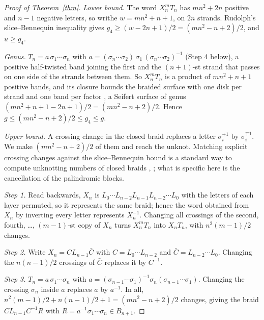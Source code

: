 \documentclass[11pt]{article}
\begin{document}
\begin{proof}[Proof of Theorem~\ref{thm}]
\emph{Lower bound.} The word $X_n^m T_n$ has $mn^2 + 2n$ positive and $n-1$ negative letters, so writhe
$w = mn^2+n+1$, on $2n$ strands. Rudolph's slice--Bennequin inequality \cite{Rud93} gives
$g_4 \ge (w - 2n + 1)/2 = (mn^2-n+2)/2$, and $u \ge g_4$.

\emph{Genus.} $T_n = a\,\sigma_1\cdots\sigma_n$ with $a = (\sigma_n\cdots\sigma_2)\,\sigma_1\,(\sigma_n\cdots\sigma_2)^{-1}$
(Step 4 below), a positive half-twisted band joining the first and the $(n+1)$-st strand that passes on one side of the
strands between them. So $X_n^m T_n$ is a product of $mn^2+n+1$ positive bands, and its closure bounds the braided
surface with one disk per strand and one band per factor \cite{Rud83}, a Seifert surface of genus
$(mn^2+n+1-2n+1)/2 = (mn^2-n+2)/2$. Hence $g \le (mn^2-n+2)/2 \le g_4 \le g$.

\emph{Upper bound.} A crossing change in the closed braid replaces a letter $\sigma_i^{\pm 1}$ by $\sigma_i^{\mp 1}$. We
make $(mn^2-n+2)/2$ of them and reach the unknot. Matching explicit crossing changes against the slice--Bennequin bound
is a standard way to compute unknotting numbers of closed braids \cite[\S 4]{Stoimenow}, \cite[\S 2]{KLMMMS}; what is
specific here is the cancellation of the palindromic blocks.

\emph{Step 1.} Read backwards, $X_n$ is $L_0 \cdots L_{n-2} L_{n-1} L_{n-2} \cdots L_0$ with the letters of each layer
permuted, so it represents the same braid; hence the word obtained from $X_n$ by inverting every letter represents
$X_n^{-1}$. Changing all crossings of the second, fourth, \dots, $(m-1)$-st copy of $X_n$ turns $X_n^m T_n$ into
$X_n T_n$, with $n^2(m-1)/2$ changes.

\emph{Step 2.} Write $X_n = C L_{n-1} \bar C$ with $C = L_0\cdots L_{n-2}$ and $\bar C = L_{n-2}\cdots L_0$. Changing the
$n(n-1)/2$ crossings of $\bar C$ replaces it by $C^{-1}$.

\emph{Step 3.} $T_n = a\,\sigma_1\cdots\sigma_n$ with $a = (\sigma_{n-1}\cdots\sigma_1)^{-1}\sigma_n(\sigma_{n-1}\cdots\sigma_1)$.
Changing the crossing $\sigma_n$ inside $a$ replaces $a$ by $a^{-1}$. In all,
$n^2(m-1)/2 + n(n-1)/2 + 1 = (mn^2-n+2)/2$ changes, giving the braid $C L_{n-1} C^{-1} R$ with
$R = a^{-1}\sigma_1\cdots\sigma_n \in B_{n+1}$.


\end{proof}
\end{document}
